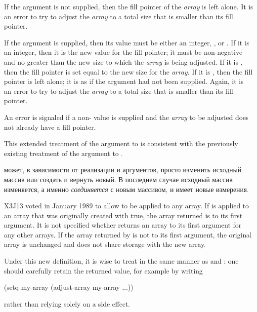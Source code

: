 \begin{defun}[Функция]
\begin{new}
If the  argument is not supplied, then the fill pointer
of the \emph{array} is left alone.  It is an error
to try to adjust the \emph{array} to a total size that is smaller
than its fill pointer.

If the  argument is supplied, then its value
must be either an integer, \true, or \false.  If it is an integer,
then it is the new value for the fill pointer;
it must be non-negative and no greater than the new size to which the
\emph{array} is being adjusted.
If it is \true, then the fill pointer is set equal to the new size
for the \emph{array}.  If it is \false, then the fill pointer is
left alone; it is as if the argument had not been supplied.
Again, it is an error
to try to adjust the \emph{array} to a total size that is smaller
than its fill pointer.

An error is signaled if a non-{\false}  value
is supplied and the \emph{array} to be adjusted does not already
have a fill pointer.

This extended treatment of the 
argument to  is consistent with the previously
existing treatment of the  argument to .
\end{new}

 может, в зависимости от реализации и аргументов, просто
изменить исходный массив или создать и вернуть новый.
В последнем случае исходный массив изменяется, а именно \emph{соединяется} с
новым массивом, и имеет новые измерения.

\begin{newer}
X3J13 voted in January 1989
to allow  to be applied to any array.
If  is applied to an array that was
originally created with  true,
the array returned is  to its first argument.  It is not specified
whether  returns an array  to its first argument for any
other arrays.  If the array returned by  is not  to its
first argument, the original array is unchanged and does not share
storage with the new array.

Under this new definition, it is wise to treat 
in the same manner as  and : one should carefully
retain the returned value, for example by writing
\begin{lisp}
(setq my-array (adjust-array my-array ...))
\end{lisp}
rather than relying solely on a side effect.
\end{newer}


\end{defun}
